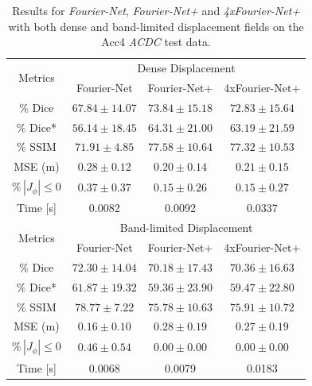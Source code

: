 \documentclass[english,version-2022-01]{uzl-thesis} %
\begin{document}
\begin{table}[h] %
	\centering
	\caption{Results for \emph{Fourier-Net}, \emph{Fourier-Net+} and \emph{4xFourier-Net+} with both dense and band-limited displacement fields on the Acc4 \emph{ACDC} test data.}
	\label{tab:DenseDisplacementAcc4}
	\begin{tabular}{c c c c} %
		\toprule
		\multirow{2}{*}{Metrics} & \multicolumn{3}{c}{Dense Displacement} \\
		\cline{2-4} 
		 & Fourier-Net & Fourier-Net+ & 4xFourier-Net+\\	
		\midrule
		$\%$ Dice & $67.84 \pm 14.07$ & $73.84 \pm 15.18$ & $72.83 \pm 15.64$\\
		$\%$ Dice* & $56.14 \pm 18.45$ & $64.31 \pm 21.00$ & $63.19 \pm 21.59$ \\
		$\%$ SSIM & $71.91 \pm 4.85$ & $77.58 \pm 10.64$ & $77.32 \pm 10.53$\\
		MSE (m) & $0.28 \pm 0.12$ & $0.20 \pm 0.14$ & $0.21 \pm 0.15$ \\
		$\% \, |J_{\phi}|\leq0$ & $0.37 \pm 0.37$ & $0.15 \pm 0.26$ & $0.15 \pm 0.27$ \\
		Time [s] 	  & 0.0082  	& 0.0092 	& 0.0337  \\
		\midrule
		\multirow{2}{*}{Metrics} & \multicolumn{3}{c}{Band-limited Displacement} \\
		\cline{2-4} 
		 & Fourier-Net & Fourier-Net+ & 4xFourier-Net+\\		
		\midrule
		$\%$ Dice & $72.30 \pm 14.04$ & $70.18 \pm 17.43$ & $70.36 \pm 16.63$\\
		$\%$ Dice* & $61.87 \pm 19.32$ & $59.36 \pm 23.90$ & $59.47 \pm 22.80$ \\
		$\%$ SSIM & $78.77 \pm 7.22$ & $75.78 \pm 10.63$ & $75.91 \pm 10.72$\\
		MSE (m) & $0.16 \pm 0.10$ & $0.28 \pm 0.19$ & $0.27 \pm 0.19$ \\
		$\% \, |J_{\phi}|\leq0$ & $ 0.46 \pm 0.54$ & $0.00 \pm 0.00$ & $0.00 \pm 0.00$ \\
		Time [s] 	  & 0.0068  	& 0.0079 	& 0.0183  \\
		\bottomrule
	\end{tabular}	
\end{table}
\end{document}
